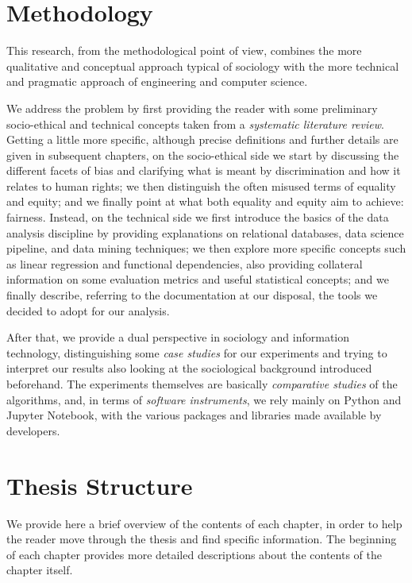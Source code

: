\section{Methodology}
This research, from the methodological point of view, combines the more qualitative and conceptual approach typical of sociology with the more technical and pragmatic approach of engineering and computer science.

We address the problem by first providing the reader with some preliminary socio-ethical and technical concepts taken from a \textit{systematic literature review}. Getting a little more specific, although precise definitions and further details are given in subsequent chapters, on the socio-ethical side we start by discussing the different facets of bias and clarifying what is meant by discrimination and how it relates to human rights; we then distinguish the often misused terms of equality and equity; and we finally point at what both equality and equity aim to achieve: fairness. Instead, on the technical side we first introduce the basics of the data analysis discipline by providing explanations on relational databases, data science pipeline, and data mining techniques; we then explore more specific concepts such as linear regression and functional dependencies, also providing collateral information on some evaluation metrics and useful statistical concepts; and we finally describe, referring to the documentation at our disposal, the tools we decided to adopt for our analysis.

After that, we provide a dual perspective in sociology and information technology, distinguishing some \textit{case studies} for our experiments and trying to interpret our results also looking at the sociological background introduced beforehand.
The experiments themselves are basically \textit{comparative studies} of the algorithms, and, in terms of \textit{software instruments}, we rely mainly on Python and Jupyter Notebook, with the various packages and libraries made available by developers.


\section{Thesis Structure}
We provide here a brief overview of the contents of each chapter, in order to help the reader move through the thesis and find specific information. The beginning of each chapter provides more detailed descriptions about the contents of the chapter itself.

